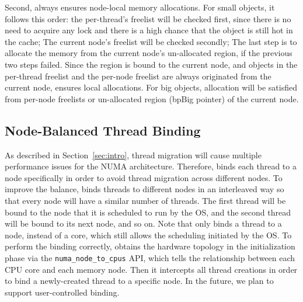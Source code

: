 Second, \NM{} always ensures node-local memory allocations. For small objects, it follows this order: the per-thread's freelist will be checked first, since there is no need to acquire any lock and there is a high chance that the object is still hot in the cache; The current node's freelist will be checked secondly; The last step is to allocate the memory from the current node's un-allocated region, if the previous two steps failed. Since the region is bound to the current node, and objects in the per-thread freelist and the per-node freelist are always originated from the current node, \NM{} ensures local allocations. For big objects, allocation will be satisfied from per-node freelists or un-allocated region (bpBig pointer) of the current node. 

\subsection{Node-Balanced Thread Binding} 
\label{sec:balance}
As described in Section~\ref{sec:intro}, thread migration will cause multiple performance issues for the NUMA architecture. Therefore, \NM{} binds each thread to a node specifically in order to avoid thread migration across different nodes. To improve the balance, \NM{} binds threads to different nodes in an interleaved way so that every node will have a similar number of threads. The first thread will be bound to the node that it is scheduled to run by the OS, and the second thread will be bound to its next node, and so on. Note that \NM{} only binds a thread to a node, instead of a core, which still allows the scheduling initiated by the OS. To perform the binding correctly, \NM{} obtains the hardware topology in the initialization phase via the \texttt{numa\_node\_to\_cpus} API, which tells the relationship between each CPU core and each memory node. Then it intercepts all thread creations in order to bind a newly-created thread to a specific node. In the future, we plan to support user-controlled binding.


 
